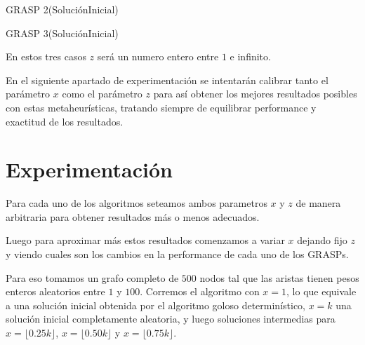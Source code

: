\begin{algorithm}
  	\begin{algorithmic}[1]\parskip=1mm
		 \caption{ GRASP 2(SoluciónInicial) }
	\end{algorithmic}
\end{algorithm}

\begin{algorithm}
  	\begin{algorithmic}[1]\parskip=1mm
		 \caption{ GRASP 3(SoluciónInicial) }
	\end{algorithmic}
\end{algorithm}

En estos tres casos $z$ será un numero entero entre $1$ e infinito.

En el siguiente apartado de experimentación se intentarán calibrar tanto el parámetro $x$ como el parámetro $z$ para así obtener los mejores resultados posibles con estas metaheurísticas, tratando siempre de equilibrar performance y exactitud de los resultados.

\section{Experimentación}

Para cada uno de los algoritmos seteamos ambos parametros $x$ y $z$ de manera arbitraria para obtener resultados más o menos adecuados.

Luego para aproximar más estos resultados comenzamos a variar $x$ dejando fijo $z$ y viendo cuales son los cambios en la performance de cada uno de los GRASPs.

Para eso tomamos un grafo completo de $500$ nodos tal que las aristas tienen pesos enteros aleatorios entre $1$ y $100$. Corremos el algoritmo con $x=1$, lo que equivale a una solución inicial obtenida por el algoritmo goloso determinístico, $x=k$ una solución inicial completamente aleatoria, y luego soluciones intermedias para $x = \lfloor0.25 k\rfloor$, $x = \lfloor0.50 k\rfloor$ y $x = \lfloor0.75 k\rfloor$.


